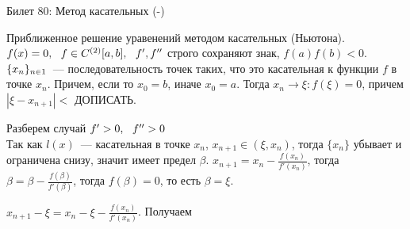 Билет 80: Метод касательных
(-)

\T \q Приближенное решение уравенений методом касательных (Ньютона). $f(x) = 0,\ \  f \in C^{(2)} [a, b],\ \  f', f''$ строго сохраняют знак, $f(a)f(b) < 0$. $\{x_{n}\}_{n \in 1}$~--- последовательность точек таких, что  это касательная к функции $f$ в точке $x_n$. Причем, если  то $x_0 = b$, иначе $x_0 = a$. Тогда $x_n \to \xi: f(\xi) = 0$, причем $|\xi - x_{n + 1}| < $ ДОПИСАТЬ.

\D Разберем случай $f' > 0,\ \  f'' >0$\\
Так как $l(x)$~--- касательная в точке $x_n$, $x_{n + 1} \in (\xi, x_n)$, тогда $\{x_n\}$ убывает и ограничена снизу, значит имеет предел $\beta$.  $x_{n + 1} = x_n - \frac{f(x_n)}{f'(x_n)}$, тогда $\beta = \beta - \frac{f(\beta)}{f'(\beta)}$, тогда $f(\beta) = 0$, то есть $\beta = \xi$.

$x_{n + 1} - \xi = x_n - \xi - \frac{f(x_n)}{f'(x_n)}$.  Получаем   